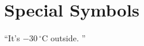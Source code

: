 \documentclass[a4paper]{article}
\begin{document}
\section{Special Symbols}
\enquote{It's $-30\,^{\circ}\mathrm{C}$ outside. }
%
%
%
%
%
%
%
%
%
%
%
%
%
%
\end{document}

